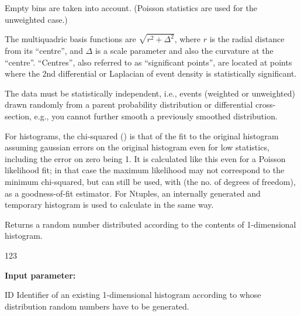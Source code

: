 \Remarks        
\begin{UL}
\item Empty bins are taken into account.  (Poisson statistics are used for the
      unweighted case.)
\item The multiquadric basis functions are $\sqrt{r^2+\Delta^2}$, where $r$ is
      the radial distance from its ``centre'', and $\Delta$ is a scale
      parameter and also the curvature at the ``centre''.  ``Centres'', also
      referred to as ``significant points'', are located at points where the
      2nd differential or Laplacian of event density is statistically
      significant.
\item The data must be statistically independent, i.e., events (weighted or
      unweighted) drawn randomly from a parent probability distribution or
      differential cross-section, e.g., you cannot further smooth a previously
      smoothed distribution.
\item For histograms, the chi-squared () is that of the fit to the
      original histogram assuming gaussian errors on the original histogram
      even for low statistics, including the error on zero being 1.  It is
      calculated like this even for a Poisson likelihood fit; in that case the
      maximum likelihood may not correspond to the minimum chi-squared, but
       can still be used, with  (the no. of degrees of freedom), as a
      goodness-of-fit estimator.  For Ntuples, an internally generated and
      temporary histogram is used to calculate  in the same way.
\end{UL}

%
%


\newpage%

\label{HRANDOMN}
 
 
\Action
Returns a random number distributed according to the contents of
1-dimensional histogram.
 
\begin{DLtt}{123}
\item[{\rm\bf Input parameter:}]
\item[ID] Identifier of an existing 1-dimensional histogram according to
whose distribution random numbers have to be generated.
\end{DLtt}
 

